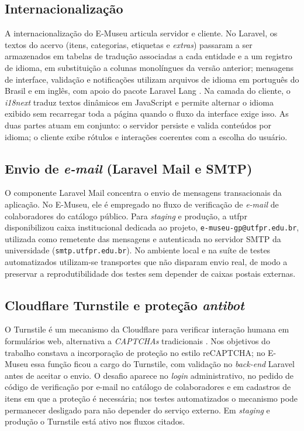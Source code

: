 \subsection{Internacionalização}\label{sec:materiais-i18n}

A internacionalização do E-Museu articula servidor e cliente. No Laravel, os textos do acervo (itens, categorias, etiquetas e \textit{extras}) passaram a ser armazenados em tabelas de tradução associadas a cada entidade e a um registro de idioma, em substituição a colunas monolíngues da versão anterior; mensagens de interface, validação e notificações utilizam arquivos de idioma em português do Brasil e em inglês, com apoio do pacote Laravel Lang \cite{laravellang}. Na camada do cliente, o \textit{i18next} traduz textos dinâmicos em JavaScript e permite alternar o idioma exibido sem recarregar toda a página quando o fluxo da interface exige isso. As duas partes atuam em conjunto: o servidor persiste e valida conteúdos por idioma; o cliente exibe rótulos e interações coerentes com a escolha do usuário.


\subsection{Envio de \textit{e-mail} (Laravel Mail e SMTP)}

O componente Laravel Mail \cite{laravel} concentra o envio de mensagens transacionais da aplicação. No E-Museu, ele é empregado no fluxo de verificação de \textit{e-mail} de colaboradores do catálogo público. Para \textit{staging} e produção, a \acrshort{utfpr} disponibilizou caixa institucional dedicada ao projeto, \texttt{e-museu-gp@utfpr.edu.br}, utilizada como remetente das mensagens e autenticada no servidor SMTP da universidade (\texttt{smtp.utfpr.edu.br}). No ambiente local e na suíte de testes automatizados utilizam-se transportes que não disparam envio real, de modo a preservar a reprodutibilidade dos testes sem depender de caixas postais externas.


\subsection{Cloudflare Turnstile e proteção \textit{antibot}}

O Turnstile é um mecanismo da Cloudflare para verificar interação humana em formulários web, alternativa a \textit{CAPTCHAs} tradicionais \cite{turnstile}. Nos objetivos do trabalho constava a incorporação de proteção no estilo reCAPTCHA; no E-Museu essa função ficou a cargo do Turnstile, com validação no \textit{back-end} Laravel antes de aceitar o envio. O desafio aparece no \textit{login} administrativo, no pedido de código de verificação por e-mail no catálogo de colaboradores e em cadastros de itens em que a proteção é necessária; nos testes automatizados o mecanismo pode permanecer desligado para não depender do serviço externo. Em \textit{staging} e produção o Turnstile está ativo nos fluxos citados.


